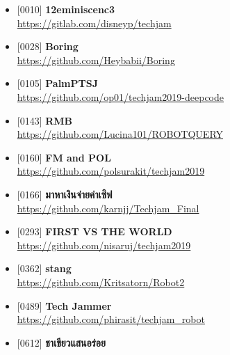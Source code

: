 \begin{itemize}[parsep=0pc]
    \item{} [0010] \textbf{12eminiscenc3} \\
        \href{https://gitlab.com/disneyp/techjam/tree/2324495c09e96261ed9d848b08f72f1dd5ac0098}{\ttfamily https://gitlab.com/disneyp/techjam}
    \item{} [0028] \textbf{Boring} \\
        \href{https://github.com/Heybabii/Boring/tree/1db6f7332008e1b86e2676fcc91b529df6d7f04a}{\ttfamily https://github.com/Heybabii/Boring}
    \item{} [0105] \textbf{PalmPTSJ} \\
        \href{https://github.com/op01/techjam2019-deepcode/tree/ffe2507f5a89028d7056452bcd3f47ff4ca38432}{\ttfamily https://github.com/op01/techjam2019-deepcode}
    \item{} [0143] \textbf{RMB} \\
        \href{https://github.com/Lucina101/ROBOTQUERY/tree/8f7e3fa803db1ba61b6d6230d258eb3350368764}{\ttfamily https://github.com/Lucina101/ROBOTQUERY}
    \item{} [0160] \textbf{FM and POL} \\
        \href{https://github.com/polsurakit/techjam2019/tree/81018559c125500604f0a294876a53ad2ab2d92b}{\ttfamily https://github.com/polsurakit/techjam2019}
    \item{} [0166] \textbf{มาหาเงินจ่ายค่าเซิฟ} \\
        \href{https://github.com/karnjj/Techjam_Final/tree/b0f98561df99bdf769882ae064f4e7fbc6b7ff02}{\ttfamily https://github.com/karnjj/Techjam\_Final}
    \item{} [0293] \textbf{FIRST VS THE WORLD} \\
        \href{https://github.com/nisaruj/techjam2019/tree/f209218493d100cfbcf58ca2d66bbacf3278b9fa}{\ttfamily https://github.com/nisaruj/techjam2019}
    \item{} [0362] \textbf{stang} \\
        \href{https://github.com/Kritsatorn/Robot2/tree/01de2a4fca8d43a6642c87b85123fbe8d2de2f2b}{\ttfamily https://github.com/Kritsatorn/Robot2}
    \item{} [0489] \textbf{Tech Jammer} \\
        \href{https://github.com/phirasit/techjam_robot/tree/eb81dc0eb6c4c6e73e2022a47fbde96477967dd7}{\ttfamily https://github.com/phirasit/techjam\_robot}
    \item{} [0612] \textbf{ชาเขียวแสนอร่อย} \\

\end{itemize}
